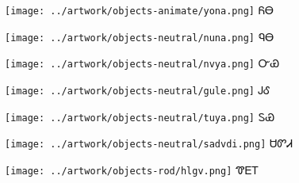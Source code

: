 \documentclass[avery5371,frame]{flashcards}%
\begin{document}
\begin{flashcard}{
\texttt{[image: ../artwork/objects-animate/yona.png]}
}
\Huge ᏲᎾ
\end{flashcard}


\begin{flashcard}{
\texttt{[image: ../artwork/objects-neutral/nuna.png]}
}
\Huge ᏄᎾ
\end{flashcard}

\begin{flashcard}{
\texttt{[image: ../artwork/objects-neutral/nvya.png]}
}
\Huge ᏅᏯ
\end{flashcard}

\begin{flashcard}{
\texttt{[image: ../artwork/objects-neutral/gule.png]}
}
\Huge ᎫᎴ
\end{flashcard}

\begin{flashcard}{
\texttt{[image: ../artwork/objects-neutral/tuya.png]}
}
\Huge ᏚᏯ
\end{flashcard}

\begin{flashcard}{
\texttt{[image: ../artwork/objects-neutral/sadvdi.png]}
}
\Huge ᏌᏛᏗ
\end{flashcard}

\begin{flashcard}{
\texttt{[image: ../artwork/objects-rod/hlgv.png]}
}
\Huge ᏡᎬᎢ
\end{flashcard}
\end{document}
